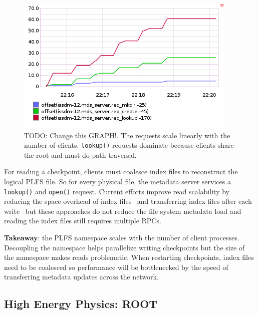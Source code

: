 \begin{figure}[tb]
\centering
  \includegraphics[width=1\linewidth]{figures/prob_reqs.png} 
  \caption{TODO: Change this GRAPH!. The requests scale linearly with the
number of clients.  \texttt{lookup()} requests dominate because clients share
the root and must do path traversal.  }\label{fig:prob_reqs}
\end{figure}

For reading a checkpoint, clients must coalesce index files to reconstruct the
logical PLFS file. So for every physical file, the metadata server services a
\texttt{lookup()} and \texttt{open()} request. Current efforts improve read
scalability by reducing the space overhead of index
files~\cite{he:hpdc13-plfs-patterns} and transferring index files after each
write~\cite{grider:pc17-diddlings} but these approaches do not reduce the file
system metadata load and reading the index files still requires multiple RPCs.

\textbf{Takeaway}: the PLFS namespace scales with the number of client
processes. Decoupling the namespace helps parallelize writing checkpoints but
the size of the namespace makes reads problematic. When restarting checkpoints,
index files need to be coalesced so performance will be bottlenecked by the
speed of transferring metadata updates across the network.

\subsection{High Energy Physics: ROOT}

